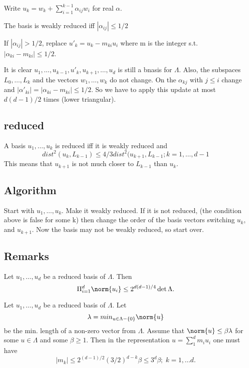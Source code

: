 Write $u_k = w_k + \sum_{i=1}^{k-1} \alpha_{ij}w_i$ for real $\alpha$.

The basis is weakly reduced iff $|\alpha_{ij}| \leq 1/2$

If $|\alpha_{ij}| > 1/2$, replace $u'_k = u_k - m_{ki}u_i$ where m is the integer s.t. $|\alpha_{ki} - m_{ki} | \leq 1/2$. 

It is clear $u_1, \dots, u_{k-1}, u'_k, u_{k+1}, \dots, u_d$ is still a bnasis for $\Lambda$. Also, the subspaces $L_0, \dots, L_k$ and the vectors $w_1, \dots, w_k$ do not change. On the $\alpha_{kj}$ with $j \leq i$ change and $|\alpha'_{ki} | = |\alpha_{ki} - m_{ki} | \leq 1/2$. So we have to apply this update at most $d(d-1)/2$ times (lower triangular).

\subsection{reduced}

A basis $u_1, \dots, u_k$ is reduced iff it is weakly reduced and \[dist^2(u_k, L_{k-1}) \leq 4/3 dist^2(u_{k+1}, L_{k-1}; k=1, \dots, d-1\] This means that $u_{k+1}$ is not much closer to $L_{k-1}$ than $u_k$.


\subsection{Algorithm}

Start with $u_1, \dots, u_k$.  
Make it weakly reduced.
If it is not reduced, (the condition above is false for some k) then change the order of the basis vectors switching $u_k$, and $u_{k+1}$. Now the basis may not be weakly reduced, so start over.

\subsection{Remarks}


\begin{corollary}
Let $u_1, \dots, u_d$ be a reduced basis of $\Lambda$. Then
\[ \Pi_{i=1}^d \norm{u_i} \leq 2^{d(d-1)/4} \det \Lambda. \]
\end{corollary}

\begin{corollary}
Let $u_1, \dots, u_d$ be a reduced basis of $\Lambda$. Let \[ \lambda = min_{u \in \Lambda - \{0\}} \norm{u} \] be the min. length of a non-zero vector from $\Lambda$. Assume that $\norm{u} \leq \beta \lambda$ for some $u \in \Lambda$ and some $\beta \geq 1$. Then in the representation $u = \sum_1^d m_i u_i$ one must have \[ |m_k| \leq 2^{(d-1)/2} (3/2)^{d-k} \beta \leq 3^d \beta; \; k = 1, \dots d.\]
\end{corollary}